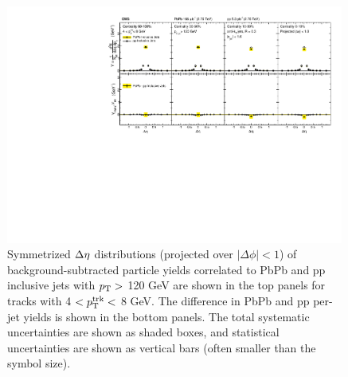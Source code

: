 \begin{figure}[hbt] 
\begin{center} 
\includegraphics[width=0.99\textwidth]{figures/Results/PAS_Figure_3_TrkPt4_TrkPt8.pdf}
\caption[Inclusive jet $\Delta\eta$ correlations for tracks with $4 < p_{\rm T}^{\rm trk} < 8$ GeV at 2.76 TeV]{Symmetrized $\protect\Delta\eta$ distributions (projected over $|\Delta\phi| < 1$) of background-subtracted particle yields correlated to PbPb and pp inclusive jets with $p_{\rm T}>$ 120 GeV are shown in the top panels for tracks with 4 $ < p_{\rm T}^{\rm trk} < $ 8 GeV.  The difference in PbPb and pp per-jet yields is shown in the bottom panels. The total systematic uncertainties are shown as shaded boxes, and statistical uncertainties are shown as vertical bars (often smaller than the symbol size).}
\label{fig:Inclusive_dEta4}
\end{center} 
\end{figure} 


